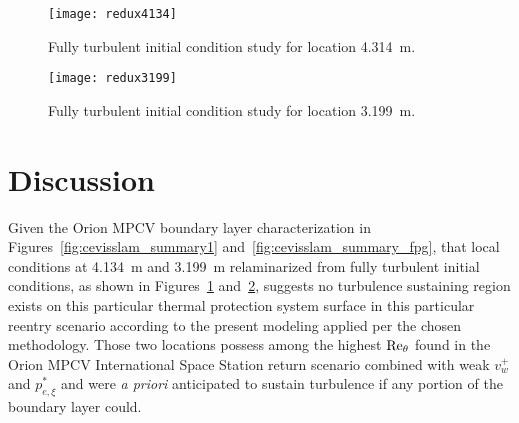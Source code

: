 
\begin{figure}
\centering\texttt{[image: redux4134]}
\caption{Fully turbulent initial condition study for location 4.314~m.\label{fig:redux4134}}
\end{figure}

\begin{figure}
\centering\texttt{[image: redux3199]}
\caption{Fully turbulent initial condition study for location 3.199~m.\label{fig:redux3199}}
\end{figure}

\clearpage
\section{Discussion}
\label{sec:relam_discussion}

Given the Orion MPCV boundary layer characterization in
Figures~\ref{fig:cevisslam_summary1} and~\ref{fig:cevisslam_summary_fpg}, that
local conditions at 4.134~m and 3.199~m relaminarized from fully turbulent
initial conditions, as shown in Figures~\ref{fig:redux4134}
and~\ref{fig:redux3199}, suggests no turbulence sustaining region exists on this
particular thermal protection system surface in this particular reentry scenario
according to the present modeling applied per the chosen methodology.  Those two
locations possess among the highest $\Reynolds[\theta]$ found in the Orion MPCV
International Space Station return scenario combined with weak $v_w^{+}$ and
$p_{e,\xi}^\ast$ and were \emph{a priori} anticipated to sustain turbulence if
any portion of the boundary layer could.

